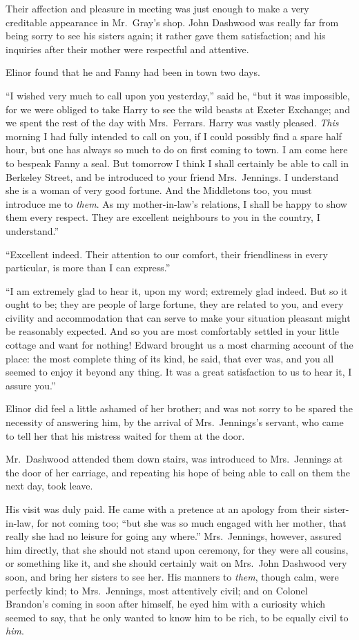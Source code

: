 \documentclass{article}
\begin{document}
Their affection and pleasure in meeting was just enough
to make a very creditable appearance in Mr.\ Gray's shop.
John Dashwood was really far from being sorry to see
his sisters again; it rather gave them satisfaction;
and his inquiries after their mother were respectful
and attentive.

Elinor found that he and Fanny had been in town
two days.

``I wished very much to call upon you yesterday,''
said he, ``but it was impossible, for we were obliged
to take Harry to see the wild beasts at Exeter Exchange;
and we spent the rest of the day with Mrs.\ Ferrars.
Harry was vastly pleased.  \emph{This} morning I had fully intended
to call on you, if I could possibly find a spare half hour,
but one has always so much to do on first coming to town.
I am come here to bespeak Fanny a seal.  But tomorrow I
think I shall certainly be able to call in Berkeley Street,
and be introduced to your friend Mrs.\ Jennings.
I understand she is a woman of very good fortune.
And the Middletons too, you must introduce me to \emph{them}.
As my mother-in-law's relations, I shall be happy to show
them every respect.  They are excellent neighbours to you in
the country, I understand.''

``Excellent indeed.  Their attention to our comfort,
their friendliness in every particular, is more than I
can express.''

``I am extremely glad to hear it, upon my word;
extremely glad indeed.  But so it ought to be; they are
people of large fortune, they are related to you, and
every civility and accommodation that can serve to make
your situation pleasant might be reasonably expected.
And so you are most comfortably settled in your little cottage
and want for nothing!  Edward brought us a most charming
account of the place: the most complete thing of its kind,
he said, that ever was, and you all seemed to enjoy it beyond
any thing.  It was a great satisfaction to us to hear it,
I assure you.''

Elinor did feel a little ashamed of her brother;
and was not sorry to be spared the necessity of answering him,
by the arrival of Mrs.\ Jennings's servant, who came to tell
her that his mistress waited for them at the door.

Mr.\ Dashwood attended them down stairs, was introduced
to Mrs.\ Jennings at the door of her carriage, and repeating
his hope of being able to call on them the next day,
took leave.

His visit was duly paid.  He came with a pretence at
an apology from their sister-in-law, for not coming too;
``but she was so much engaged with her mother, that really
she had no leisure for going any where.''  Mrs.\ Jennings,
however, assured him directly, that she should not stand
upon ceremony, for they were all cousins, or something
like it, and she should certainly wait on Mrs.\ John
Dashwood very soon, and bring her sisters to see her.
His manners to \emph{them}, though calm, were perfectly kind;
to Mrs.\ Jennings, most attentively civil; and on Colonel
Brandon's coming in soon after himself, he eyed him with a
curiosity which seemed to say, that he only wanted to know
him to be rich, to be equally civil to \emph{him}.
\end{document}

